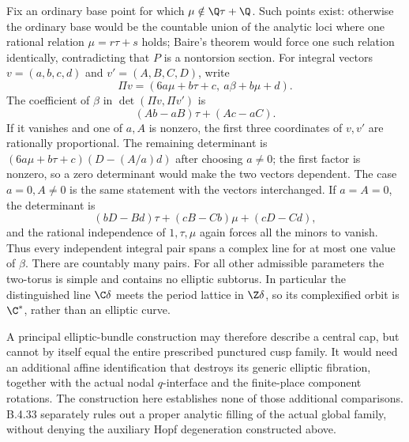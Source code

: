 \begin{remark}
Fix an ordinary base point for which
$\mu\notin\Q\tau+\Q$.  Such points exist: otherwise the
ordinary base would be the countable union of the analytic loci
where one rational relation $\mu=r\tau+s$ holds; Baire's
theorem would force one such relation identically, contradicting
that $P$ is a nontorsion section.  For integral vectors
$v=(a,b,c,d)$ and $v'=(A,B,C,D)$, write
\[
 \Pi v=(6a\mu+b\tau+c,\ a\beta+b\mu+d).
\]
The coefficient of $\beta$ in
$\det(\Pi v,\Pi v')$ is
\[
 (Ab-aB)\tau+(Ac-aC).
\]
If it vanishes and one of $a,A$ is nonzero, the first three
coordinates of $v,v'$ are rationally proportional.  The
remaining determinant is
$(6a\mu+b\tau+c)(D-(A/a)d)$ after choosing $a\ne0$;
the first factor is nonzero, so a zero determinant would make
the two vectors dependent.  The case $a=0,A\ne0$ is the
same statement with the vectors interchanged.  If $a=A=0$,
the determinant is
\[
 (bD-Bd)\tau+(cB-Cb)\mu+(cD-Cd),
\]
and the rational independence of $1,\tau,\mu$ again forces
all the minors to vanish.  Thus every independent integral
pair spans a complex line for at most one value of $\beta$.
There are countably many pairs.  For all other admissible
parameters the two-torus is simple and contains no elliptic
subtorus.  In particular the distinguished line $\C\delta$
meets the period lattice in $\Z\delta$, so its complexified
orbit is $\C^*$, rather than an elliptic curve.

A principal elliptic-bundle construction may therefore describe
a central cap, but cannot by itself equal the entire prescribed
punctured cusp family.  It would need an additional affine
identification that destroys its generic elliptic fibration,
together with the actual nodal $q$-interface and the finite-place
component rotations. The construction here establishes none of
those additional comparisons. B.4.33 separately rules out a proper
analytic filling of the actual global family, without denying the
auxiliary Hopf degeneration constructed above.
\end{remark}

